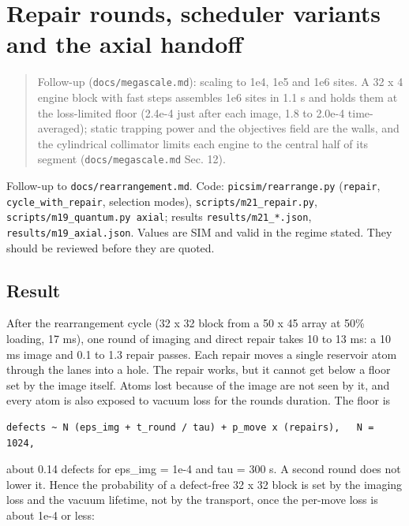 \hypertarget{repair-rounds-scheduler-variants-and-the-axial-handoff}{%
\chapter{Repair rounds, scheduler variants and the axial
handoff}\label{repair-repair-rounds-scheduler-variants-and-the-axial-handoff}}

\begin{quote}
Follow-up (\texttt{docs/megascale.md}): scaling to 1e4, 1e5 and 1e6
sites. A 32 x 4 engine block with fast steps assembles 1e6 sites in 1.1
s and holds them at the loss-limited floor (2.4e-4 just after each
image, 1.8 to 2.0e-4 time-averaged); static trapping power and the
objective\textquotesingle s field are the walls, and the cylindrical
collimator limits each engine to the central half of its segment
(\texttt{docs/megascale.md} Sec. 12).
\end{quote}

Follow-up to \texttt{docs/rearrangement.md}. Code:
\texttt{picsim/rearrange.py} (\texttt{repair},
\texttt{cycle\_with\_repair}, selection modes),
\texttt{scripts/m21\_repair.py},
\texttt{scripts/m19\_quantum.py\ axial}; results
\texttt{results/m21\_*.json}, \texttt{results/m19\_axial.json}. Values
are SIM and valid in the regime stated. They should be reviewed before
they are quoted.

\hypertarget{1-result}{%
\section{Result}\label{repair-1-result}}

After the rearrangement cycle (32 x 32 block from a 50 x 45 array at
50\% loading, 17 ms), one round of imaging and direct repair takes 10 to
13 ms: a 10 ms image and 0.1 to 1.3 repair passes. Each repair moves a
single reservoir atom through the lanes into a hole. The repair works,
but it cannot get below a floor set by the image itself. Atoms lost
because of the image are not seen by it, and every atom is also exposed
to vacuum loss for the round\textquotesingle s duration. The floor is

\begin{verbatim}
defects ~ N (eps_img + t_round / tau) + p_move x (repairs),   N = 1024,
\end{verbatim}

about 0.14 defects for eps\_img = 1e-4 and tau = 300 s. A second round
does not lower it. Hence the probability of a defect-free 32 x 32 block
is set by the imaging loss and the vacuum lifetime, not by the
transport, once the per-move loss is about 1e-4 or less:

